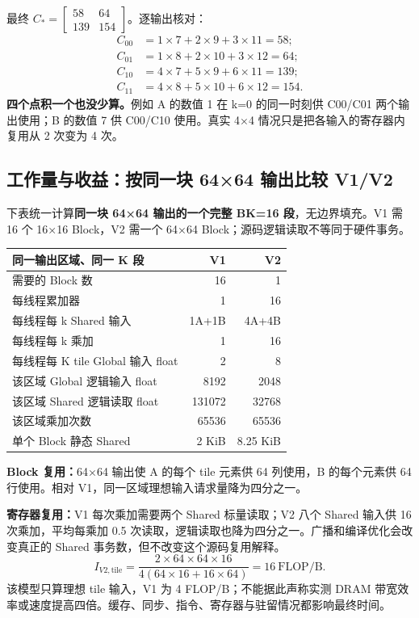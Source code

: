 最终 $C_* = \begin{bmatrix}58&64\\139&154\end{bmatrix}$。逐输出核对：
\begin{align*}
C_{00}&=1\times7+2\times9+3\times11=58;\\
C_{01}&=1\times8+2\times10+3\times12=64;\\
C_{10}&=4\times7+5\times9+6\times11=139;\\
C_{11}&=4\times8+5\times10+6\times12=154.
\end{align*}
\textbf{四个点积一个也没少算。}例如 A 的数值 1 在 k=0 的同一时刻供 C00/C01 两个输出使用；B 的数值 7 供 C00/C10 使用。真实 4×4 情况只是把各输入的寄存器内复用从 2 次变为 4 次。
\pagebreakhere

\subsection{工作量与收益：按同一块 64×64 输出比较 V1/V2}
下表统一计算\textbf{同一块 64×64 输出的一个完整 BK=16 段}，无边界填充。V1 需 16 个 16×16 Block，V2 需一个 64×64 Block；源码逻辑读取不等同于硬件事务。
\begin{table}[H]\centering\small
\begin{tabular}{lrr}
\toprule
同一输出区域、同一 K 段 & V1 & V2\\\midrule
需要的 Block 数 & 16 & 1\\
每线程累加器 & 1 & 16\\
每线程每 k Shared 输入 & 1A+1B & 4A+4B\\
每线程每 k 乘加 & 1 & 16\\
每线程每 K tile Global 输入 float & 2 & 8\\
该区域 Global 逻辑输入 float & 8192 & 2048\\
该区域 Shared 逻辑读取 float & 131072 & 32768\\
该区域乘加次数 & 65536 & 65536\\
单个 Block 静态 Shared & 2 KiB & 8.25 KiB\\\bottomrule
\end{tabular}
\end{table}
\textbf{Block 复用：}64×64 输出使 A 的每个 tile 元素供 64 列使用，B 的每个元素供 64 行使用。相对 V1，同一区域理想输入请求量降为四分之一。

\textbf{寄存器复用：}V1 每次乘加需要两个 Shared 标量读取；V2 八个 Shared 输入供 16 次乘加，平均每乘加 0.5 次读取，逻辑读取也降为四分之一。广播和编译优化会改变真正的 Shared 事务数，但不改变这个源码复用解释。
\[
I_{V2,\mathrm{tile}}=\frac{2\times64\times64\times16}{4(64\times16+16\times64)}
=16\ \mathrm{FLOP/B}.
\]
该模型只算理想 tile 输入，V1 为 4 FLOP/B；不能据此声称实测 DRAM 带宽效率或速度提高四倍。缓存、同步、指令、寄存器与驻留情况都影响最终时间。

